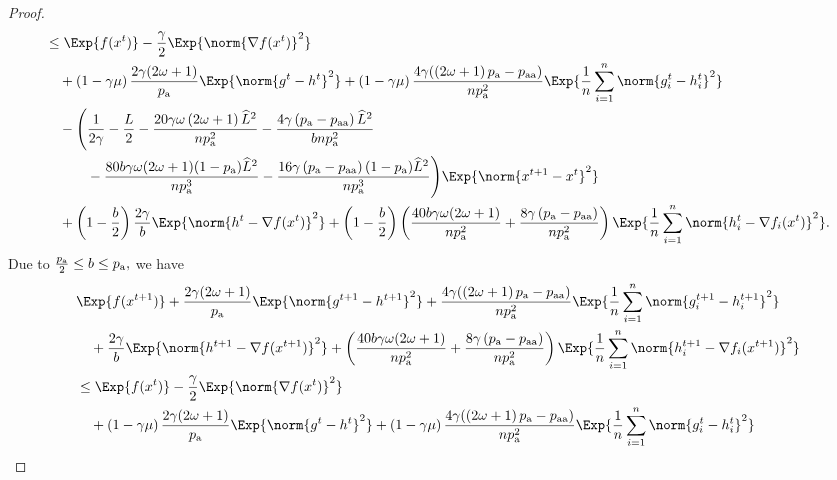 \documentclass{article}
\newcommand*{\probavailable}{\ensuremath{p_{\textnormal{a}}}}
\newcommand*{\probpairaa}{\ensuremath{p_{\textnormal{aa}}}}
\begin{document}
\begin{proof}
\begin{align*}
      &\leq \Exp{f(x^t)} - \frac{\gamma}{2}\Exp{\norm{\nabla f(x^t)}^2} \\
      &\quad + \left(1 - \gamma \mu\right)\frac{2\gamma (2 \omega + 1)}{\probavailable} \Exp{\norm{g^{t} - h^{t}}^2} + \left(1 - \gamma \mu\right)\frac{4\gamma (\left(2 \omega + 1\right)\probavailable - \probpairaa)}{n \probavailable^2} \Exp{\frac{1}{n}\sum_{i=1}^n\norm{g^{t}_i - h^{t}_i}^2} \\
      &\quad - \Bigg(\frac{1}{2\gamma} - \frac{L}{2} - \frac{20 \gamma \omega \left(2 \omega + 1\right) \widehat{L}^2}{n \probavailable^2} - \frac{4\gamma \left(\probavailable - \probpairaa\right)\widehat{L}^2}{b n \probavailable^2} \\
      &\quad\qquad - \frac{80 b \gamma \omega (2 \omega + 1) (1 - \probavailable) \widehat{L}^2}{n \probavailable^3} - \frac{16 \gamma \left(\probavailable - \probpairaa\right) (1 - \probavailable) \widehat{L}^2}{n \probavailable^3} \Bigg) \Exp{\norm{x^{t+1} - x^t}^2} \\
      &\quad + \left(1 - \frac{b}{2}\right)\frac{2\gamma}{b} \Exp{\norm{h^{t} - \nabla f(x^{t})}^2} + \left(1 - \frac{b}{2}\right)\left(\frac{40 b \gamma \omega (2 \omega + 1)}{n \probavailable^2} + \frac{8 \gamma \left(\probavailable - \probpairaa\right)}{n \probavailable^2}\right)\Exp{\frac{1}{n}\sum_{i=1}^n\norm{h^{t}_i - \nabla f_i(x^{t})}^2}.
    \end{align*}
    Due to $\frac{\probavailable}{2} \leq b \leq \probavailable,$ we have
    \begin{align*}
      &\Exp{f(x^{t + 1})} + \frac{2\gamma (2 \omega + 1)}{\probavailable} \Exp{\norm{g^{t+1} - h^{t+1}}^2} + \frac{4\gamma (\left(2 \omega + 1\right)\probavailable - \probpairaa)}{n \probavailable^2} \Exp{\frac{1}{n}\sum_{i=1}^n\norm{g^{t+1}_i - h^{t+1}_i}^2}\\
      &\quad  + \frac{2\gamma}{b} \Exp{\norm{h^{t+1} - \nabla f(x^{t+1})}^2} + \left(\frac{40 b \gamma \omega (2 \omega + 1)}{n \probavailable^2} + \frac{8 \gamma \left(\probavailable - \probpairaa\right)}{n \probavailable^2}\right) \Exp{\frac{1}{n}\sum_{i=1}^n\norm{h^{t+1}_i - \nabla f_i(x^{t+1})}^2}\\
      &\leq \Exp{f(x^t)} - \frac{\gamma}{2}\Exp{\norm{\nabla f(x^t)}^2} \\
      &\quad + \left(1 - \gamma \mu\right)\frac{2\gamma (2 \omega + 1)}{\probavailable} \Exp{\norm{g^{t} - h^{t}}^2} + \left(1 - \gamma \mu\right)\frac{4\gamma (\left(2 \omega + 1\right)\probavailable - \probpairaa)}{n \probavailable^2} \Exp{\frac{1}{n}\sum_{i=1}^n\norm{g^{t}_i - h^{t}_i}^2} \\

\end{align*}
\end{proof}
\end{document}
